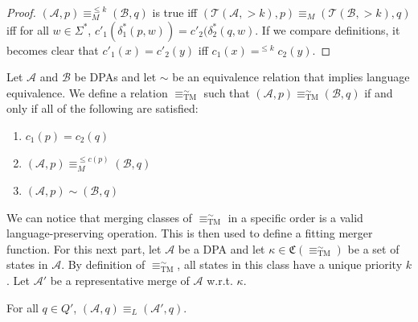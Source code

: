 \begin{proof}
	$(\mathcal{A}, p) \equiv_M^{\leq k} (\mathcal{B}, q)$ is true iff $(\mathcal{T}(\mathcal{A}, >k), p) \equiv_M (\mathcal{T}(\mathcal{B}, >k), q)$ iff for all $w \in \Sigma^*$, $c'_1(\delta_1^*(p, w)) = c'_2(\delta_2^*(q, w)$. If we compare definitions, it becomes clear that $c'_1(x) = c'_2(y)$ iff $c_1(x) =^{\leq k} c_2(y)$.
\end{proof}

\vspace{5pt}

\begin{defn}
	Let $\mathcal{A}$ and $\mathcal{B}$ be DPAs and let $\sim$ be an equivalence relation that implies language equivalence. We define a relation $\equiv_\text{TM}^\sim$ such that $(\mathcal{A}, p) \equiv^\sim_\text{TM} (\mathcal{B}, q)$ if and only if all of the following are satisfied:
	\begin{enumerate}
		\item $c_1(p) = c_2(q)$
		\item $(\mathcal{A}, p) \equiv_M^{\leq c(p)} (\mathcal{B}, q)$
		\item $(\mathcal{A}, p) \sim (\mathcal{B}, q)$
	\end{enumerate}
\end{defn}

\vspace{5pt}

We can notice that merging classes of $\equiv_\text{TM}^\sim$ in a specific order is a valid language-preserving operation. This is then used to define a fitting merger function. For this next part, let $\mathcal{A}$ be a DPA and let $\kappa \in \mathfrak{C}(\equiv^\sim_\text{TM})$ be a set of states in $\mathcal{A}$. By definition of $\equiv^\sim_\text{TM}$, all states in this class have a unique priority $k$. Let $\mathcal{A}'$ be a representative merge of $\mathcal{A}$ w.r.t. $\kappa$.

\begin{lem}
	For all $q \in Q'$, $(\mathcal{A}, q) \equiv_L (\mathcal{A}', q)$.
	\label{lem:tremoore:merge_keep_lang}
\end{lem}


